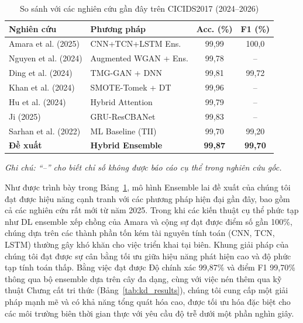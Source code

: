 \begin{table}[htbp]
\centering
\caption{So sánh với các nghiên cứu gần đây trên CICIDS2017 (2024--2026)}
\label{tab:literature_comparison}
\begin{tabularx}{\columnwidth}{@{}p{2.8cm}Xcc@{}}
\toprule
\textbf{Nghiên cứu} & \textbf{Phương pháp} & \textbf{Acc. (\%)} & \textbf{F1 (\%)} \\
\midrule
Amara et al. (2025) \cite{amara2025stacked}     & CNN+TCN+LSTM Ens.     & 99,99 & 100,0 \\
Nguyen et al. (2024) \cite{nguyen2024apelid}     & Augmented WGAN + Ens. & 99,78 & --    \\
Ding et al. (2024) \cite{ding2024tmg}      & TMG-GAN + DNN         & 99,81 & 99,72 \\
Khan et al. (2024) \cite{khan2024balanced}      & SMOTE-Tomek + DT      & 99,96 & --    \\
Hu et al. (2024) \cite{hu2024improved}        & Hybrid Attention      & 99,79 & --    \\
Ji (2025) \cite{ji2025hybrid}             & GRU-ResCBANet         & 99,83 & --    \\
Sarhan et al. (2022) \cite{sarhan2022towards}    & ML Baseline (TII)     & 99,70 & 99,20 \\
\midrule
\textbf{Đề xuất}     & \textbf{Hybrid Ensemble} & \textbf{99,87} & \textbf{99,70} \\
\bottomrule
\end{tabularx}
\vspace{2pt}
\footnotesize{\textit{Ghi chú: ``--'' cho biết chỉ số không được báo cáo cụ thể trong nghiên cứu gốc.}}
\end{table}

Như được trình bày trong Bảng~\ref{tab:literature_comparison}, mô hình Ensemble lai đề xuất của chúng tôi đạt được hiệu năng cạnh tranh với các phương pháp hiện đại gần đây, bao gồm cả các nghiên cứu rất mới từ năm 2025. Trong khi các kiến thuật cụ thể phức tạp như DL ensemble xếp chồng của Amara và cộng sự \cite{amara2025stacked} đạt được điểm số gần 100\%, chúng dựa trên các thành phần tốn kém tài nguyên tính toán (CNN, TCN, LSTM) thường gây khó khăn cho việc triển khai tại biên. Khung giải pháp của chúng tôi đạt được sự cân bằng tối ưu giữa hiệu năng phát hiện cao và độ phức tạp tính toán thấp. Bằng việc đạt được Độ chính xác 99,87\% và điểm F1 99,70\% thông qua bộ ensemble dựa trên cây đa dạng, cùng với việc nén thêm qua kỹ thuật Chưng cất tri thức (Bảng~\ref{tab:kd_results}), chúng tôi cung cấp một giải pháp mạnh mẽ và có khả năng tổng quát hóa cao, được tối ưu hóa đặc biệt cho các môi trường biên thời gian thực với yêu cầu độ trễ dưới một phần nghìn giây.

